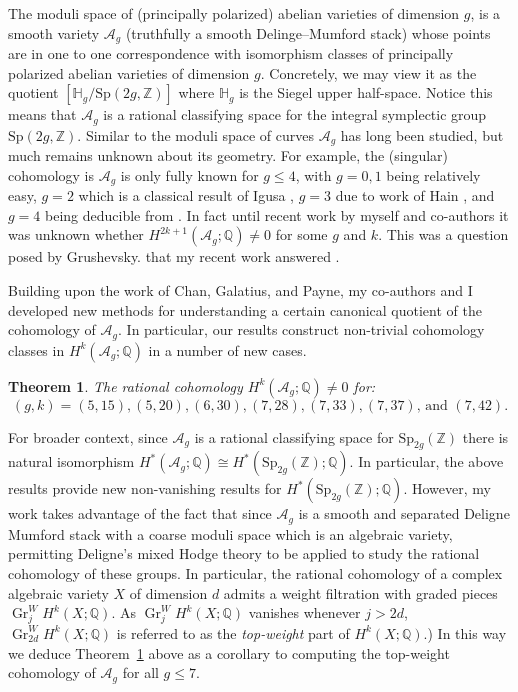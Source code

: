 \documentclass[11pt,reqno]{amsart}
\newtheorem{theorem}[lemma]{Theorem}
\theoremstyle{remark}
\newcommand{\Gr}{\operatorname{Gr}}
\newcommand{\HH}{\mathbb{H}}
\newcommand{\QQ}{\mathbb{Q}}
\newcommand{\ZZ}{\mathbb{Z}}
\newcommand{\cA}{\mathcal{A}}
\begin{document}
The moduli space of (principally polarized) abelian varieties of dimension $g$, is a smooth variety $\cA_{g}$ (truthfully a smooth Delinge--Mumford stack) whose points are in one to one correspondence with isomorphism classes of principally polarized abelian varieties of dimension $g$. Concretely, we may view it as the quotient $[\mathbb{H}_g/\mathrm{Sp}(2g, \ZZ)]$ where $\HH_{g}$ is the Siegel upper half-space. Notice this means that $\cA_{g}$  is a rational classifying space for the integral symplectic group $\mathrm{Sp}(2g,\ZZ)$. Similar to the moduli space of curves $\cA_{g}$ has long been studied, but much remains unknown about its geometry. For example, the (singular) cohomology is $\cA_{g}$ is only fully known for $g\leq 4$, with $g=0,1$ being relatively easy, $g=2$ which is a classical result of Igusa \cite{igusa62},  $g=3$ due to work of Hain \cite{hain02}, and $g=4$ being deducible from \cite{HT12,HT18}. In fact until recent work by myself and co-authors it was unknown whether $H^{2k+1}(\cA_{g};\QQ)\neq0$ for some $g$ and $k$. This was a question posed by Grushevsky. that my recent work answered \cite{grushevsky09}. 

Building upon the work of Chan, Galatius, and Payne, my co-authors and I developed new methods for understanding a certain canonical quotient of the cohomology of $\cA_{g}$. In particular, our results construct non-trivial cohomology classes in $H^{k}(\cA_{g}; \QQ)$ in a number of new cases. 

\begin{theorem}\cite[Theorem A]{BBCMMW24}\label{thm:Ag}
The rational cohomology $H^{k}\left(\cA_{g};\QQ\right)\neq0$ for:
\[
\text{$(g,k)=(5,15),(5,20),(6,30),(7,28),(7,33),(7,37)$, and $(7,42)$}.
\]
\end{theorem}

For broader context, since $\cA_g$ is a rational classifying space for $\mathrm{Sp}_{2g}(\ZZ)$ there is natural isomorphism $H^*(\cA_g;\QQ) \cong H^*(\mathrm{Sp}_{2g}(\ZZ);\QQ)$. In particular, the above results provide new non-vanishing results for $H^*(\mathrm{Sp}_{2g}(\ZZ);\QQ)$. However, my work takes advantage of the fact that since $\cA_g$  is a smooth and separated Deligne Mumford stack with a coarse moduli space which is an algebraic variety, permitting Deligne's mixed Hodge theory to be applied to study the rational cohomology of these groups. In particular, the rational cohomology of a %
complex algebraic variety $X$ of dimension $d$ admits a weight filtration with graded pieces $\Gr_{j}^W\!H^k(X;\mathbb{Q})$. %
As $\Gr_{j}^W\!H^k(X;\mathbb{Q})$ vanishes whenever $j>2d$, $\Gr_{2d}^W\!H^k(X;\mathbb{Q})$ is referred to as the {\em top-weight} part of $H^k(X;\QQ)$.)  In this way we deduce Theorem~\ref{thm:Ag} above as a corollary to computing the top-weight cohomology of $\cA_{g}$ for all $g\leq 7$.  
\end{document}
